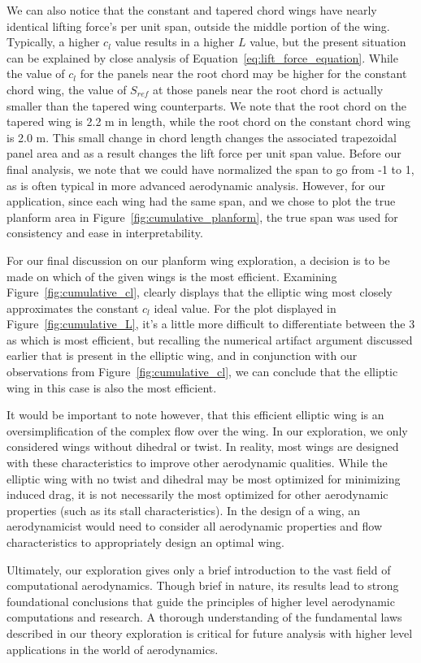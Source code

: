 \documentclass{article}
\begin{document}
We can also notice that the constant and tapered chord wings have nearly identical lifting force's per unit span, outside the middle portion of the wing.
Typically, a higher $c_l$ value results in a higher $L$ value, but the present situation can be explained by close analysis of Equation~\ref{eq:lift_force_equation}.
While the value of $c_l$ for the panels near the root chord may be higher for the constant chord wing, the value of $S_{ref}$ at those panels near the root chord is actually smaller than the tapered wing counterparts.
We note that the root chord on the tapered wing is 2.2 m in length, while the root chord on the constant chord wing is 2.0 m. This small change in chord length changes the associated trapezoidal panel area and as a result changes the lift force per unit span value.
Before our final analysis, we note that we could have normalized the span to go from -1 to 1, as is often typical in more advanced aerodynamic analysis. However, for our application, since each wing had the same span, and we chose to plot the true planform area in Figure~\ref{fig:cumulative_planform}, the true span was used for consistency and ease in interpretability.


For our final discussion on our planform wing exploration, a decision is to be made on which of the given wings is the most efficient.
Examining Figure~\ref{fig:cumulative_cl}, clearly displays that the elliptic wing most closely approximates the constant $c_l$ ideal value.
For the plot displayed in Figure~\ref{fig:cumulative_L}, it's a little more difficult to differentiate between the 3 as which is most efficient, 
but recalling the numerical artifact argument discussed earlier that is present in the elliptic wing, and in conjunction with our observations from Figure~\ref{fig:cumulative_cl}, we can conclude that the elliptic wing in this case is also the most efficient.

It would be important to note however, that this efficient elliptic wing is an oversimplification of the complex flow over the wing.
In our exploration, we only considered wings without dihedral or twist. In reality, most wings are designed with these characteristics to improve other aerodynamic qualities.
While the elliptic wing with no twist and dihedral may be most optimized for minimizing induced drag, it is not necessarily the most optimized for other aerodynamic properties (such as its stall characteristics).
In the design of a wing, an aerodynamicist would need to consider all aerodynamic properties and flow characteristics to appropriately design an optimal wing.


Ultimately, our exploration gives only a brief introduction to the vast field of computational aerodynamics. Though brief in nature, its results lead to strong foundational conclusions that guide the principles of higher level
aerodynamic computations and research. A thorough understanding of the fundamental laws described in our theory exploration is critical for future analysis with higher level applications in the world of aerodynamics.
\end{document}
